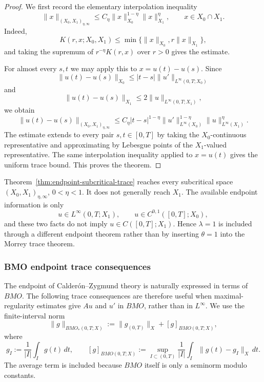 \documentclass[smallextended,envcountsect,envcountsame]{svjour3}
\begin{document}
	\begin{proof}
	We first record the elementary interpolation inequality
	\[
	\|x\|_{(X_0,X_1)_{\eta,\infty}}
	\le
	C_\eta \|x\|_{X_0}^{1-\eta}\|x\|_{X_1}^{\eta},
	\qquad x\in X_0\cap X_1.
	\]
	Indeed,
	\[
	K(r,x;X_0,X_1)\le \min\{\|x\|_{X_0},r\|x\|_{X_1}\},
	\]
	and taking the supremum of $r^{-\eta}K(r,x)$ over $r>0$ gives the estimate.

	For almost every $s,t$ we may apply this to $x=u(t)-u(s)$. Since
	\[
	\|u(t)-u(s)\|_{X_0}
	\le |t-s|\|u'\|_{L^\infty(0,T;X_0)}
	\]
	and
	\[
	\|u(t)-u(s)\|_{X_1}
	\le 2\|u\|_{L^\infty(0,T;X_1)},
	\]
	we obtain
	\[
	\|u(t)-u(s)\|_{(X_0,X_1)_{\eta,\infty}}
	\le
	C_\eta |t-s|^{1-\eta}
	\|u'\|_{L^\infty(X_0)}^{1-\eta}
	\|u\|_{L^\infty(X_1)}^{\eta}.
	\]
	The estimate extends to every pair $s,t\in[0,T]$ by taking the $X_0$-continuous representative and approximating by Lebesgue points of the $X_1$-valued representative. The same interpolation inequality applied to $x=u(t)$ gives the uniform trace bound. This proves the theorem.
	\end{proof}

	\begin{remark}\label{rem:endpoint-no-x1}
	Theorem~\ref{thm:endpoint-subcritical-trace} reaches every subcritical space $(X_0,X_1)_{\eta,\infty}$, $0<\eta<1$. It does not generally reach $X_1$. The available endpoint information is only
	\[
	u\in L^\infty(0,T;X_1),
	\qquad
	u\in C^{0,1}([0,T];X_0),
	\]
	and these two facts do not imply $u\in C([0,T];X_1)$. Hence $\lambda=1$ is included through a different endpoint theorem rather than by inserting $\theta=1$ into the Morrey trace theorem.
	\end{remark}


	\subsubsection{BMO endpoint trace consequences}\label{subsubsec:bmo-trace}

	The endpoint of Calder\'on--Zygmund theory is naturally expressed in terms of \(BMO\).  The following trace consequences are therefore useful when maximal-regularity estimates give \(Au\) and \(u'\) in \(BMO\), rather than in \(L^\infty\).  We use the finite-interval norm
	\[
	\|g\|_{BMO_*(0,T;X)}:=\|g_{(0,T)}\|_X+[g]_{BMO(0,T;X)},
	\]
	where
	\[
	g_I:=\frac1{|I|}\int_I g(t)\,dt,
	\qquad
	[g]_{BMO(0,T;X)}:=
	\sup_{I\subset(0,T)}\frac1{|I|}\int_I\|g(t)-g_I\|_X\,dt.
	\]
	The average term is included because \(BMO\) itself is only a seminorm modulo constants.
\end{document}
